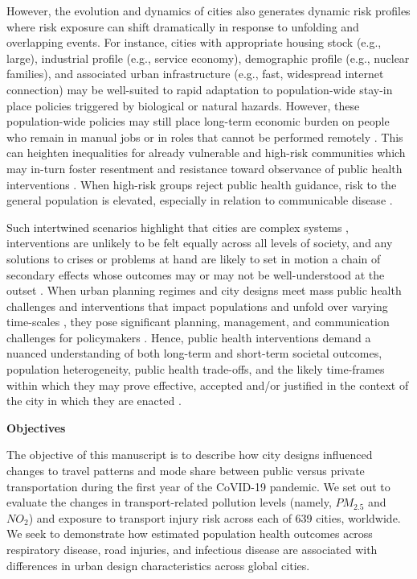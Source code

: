 \documentclass[preprint,12pt]{elsarticle}
\begin{document}
However, the evolution and dynamics of cities also generates dynamic risk profiles where risk exposure can shift dramatically in response to unfolding and overlapping events. For instance, cities with appropriate housing stock (e.g., large), industrial profile (e.g., service economy), demographic profile (e.g., nuclear families), and associated urban infrastructure (e.g., fast, widespread internet connection) may be well-suited to rapid adaptation to population-wide stay-in place policies \cite{hale2021global} triggered by biological or natural hazards. However, these population-wide policies may still place long-term economic burden on people who remain in manual jobs or in roles that cannot be performed remotely \cite{CraigWFH,Vyas2021}. This can heighten inequalities for already vulnerable and high-risk communities \cite{martin2020fighting} which may in-turn foster resentment and resistance toward observance of public health interventions \cite{de2016sustainability}. When high-risk groups reject public health guidance, risk to the general population is elevated, especially in relation to communicable disease \cite{koopman2005control}.

Such intertwined scenarios highlight that cities are complex systems \cite{DiezRoux2015}, interventions are unlikely to be felt equally across all levels of society, and any solutions to crises or problems at hand are likely to set in motion a chain of secondary effects whose outcomes may or may not be well-understood at the outset \cite{Sterman2006}. When urban planning regimes and city designs meet mass public health challenges and interventions that impact populations and unfold over varying time-scales \cite{casti2012x}, they pose significant planning, management, and communication challenges for policymakers \cite{thompson2022modelling,thompson2022framework}. Hence, public health interventions demand a nuanced understanding of both long-term and short-term societal outcomes, population heterogeneity, public health trade-offs, and the likely time-frames within which they may prove effective, accepted and/or justified in the context of the city in which they are enacted \cite{dawson2016snakes, oliu2021sars}.


\textbf{Objectives}

The objective of this manuscript is to describe how city designs influenced changes to travel patterns and mode share between public versus private transportation during the first year of the CoVID-19 pandemic. We set out to evaluate the changes in transport-related pollution levels (namely, \(PM_{2.5}\) and \(NO_{2}\)) and exposure to transport injury risk across each of 639 cities, worldwide. We seek to demonstrate how estimated population health outcomes across respiratory disease, road injuries, and infectious disease are associated with differences in urban design characteristics across global cities.
\end{document}
